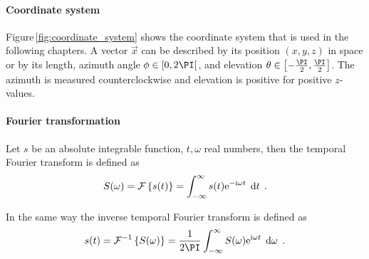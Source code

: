 \paragraph{Coordinate system}
Figure\,\ref{fig:coordinate_system} shows the coordinate system that is used in
the following chapters. A vector $\vec{x}$ can be described by its position
$(x,y,z)$ in space or by its length, azimuth angle $\phi \in [0,2\PI[$,
and elevation $\theta \in \left[-\frac{\PI}{2},\frac{\PI}{2}\right]$.
The azimuth is measured counterclockwise and elevation is positive
for positive $z$-values.


\paragraph{Fourier transformation}
Let $s$ be an absolute integrable function, $t,\omega$ real numbers, then the
temporal Fourier transform is defined as\autocite{Bracewell2000}
%
\begin{equation}
    S(\omega) = \FT{s(t)} = \int^{\infty}_{-\infty} s(t) \E^{-\I\omega t}
    \; \D{t}
    \qp
    \label{eq:ft}
\end{equation}

In the same way the inverse temporal Fourier transform is defined as
%
\begin{equation}
    s(t) = \IFT{S(\omega)} = \frac{1}{2\PI} \int^{\infty}_{-\infty} S(\omega)
    \E^{\I\omega t} \; \D\omega
    \qp
    \label{eq:ift}
\end{equation}
